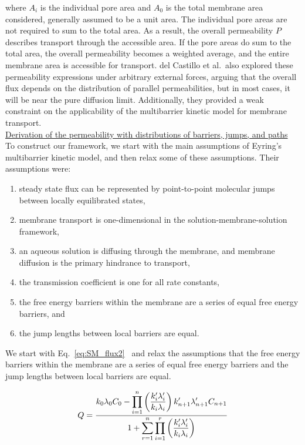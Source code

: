 \noindent where $A_i$ is the individual pore area and $A_0$ is the total membrane area considered, generally assumed to be a unit area. The individual pore areas are not required to sum to the total area. As a result, the overall permeability $P$ describes transport through the accessible area. If the pore areas do sum to the total area, the overall permeability becomes a weighted average, and the entire  membrane area is accessible for transport. del Castillo et al.~also explored these permeability expressions under arbitrary external forces, arguing that the overall flux depends on the distribution of parallel permeabilities, but in most cases, it will be near the pure diffusion limit. Additionally, they provided a weak constraint on the applicability of the multibarrier kinetic model for membrane transport. \\

\noindent \underline{Derivation of the permeability with distributions of barriers, jumps, and paths} \\
To construct our framework, we start with the main assumptions of Eyring's multibarrier kinetic model, and then relax some of these assumptions. Their assumptions were: 
\begin{enumerate}
    \item steady state flux can be represented by point-to-point molecular jumps between locally equilibrated states,
    \item membrane transport is one-dimensional in the solution-membrane-solution framework,
    \item an aqueous solution is diffusing through the membrane, and membrane diffusion is the primary hindrance to transport,
    \item the transmission coefficient is one for all rate constants,
    \item the free energy barriers within the membrane are a series of equal free energy barriers, and 
    \item the jump lengths between local barriers are equal.
\end{enumerate}

We start with Eq.~\ref{eq:SM_flux2}~\cite{zwolinski_diffusion_1949} and relax the assumptions that the free energy barriers within the membrane are a series of equal free energy barriers and the jump lengths between local barriers are equal.

\begin{equation}
    Q = \frac{ \displaystyle k_0 \lambda_{0} C_0 - \prod_{i=1}^n \left( \frac{k_i' \lambda_{i}'}{k_i \lambda_{i}} \right) k_{n+1}' \lambda_{n+1}' C_{n+1} } { \displaystyle 1 +  \sum_{r=1}^n \prod_{i=1}^r \left( \frac{k_i' \lambda_{i}'}{k_i \lambda_{i}} \right) }
    \label{eq:SM_flux2}
\end{equation}

